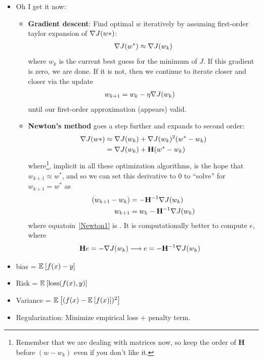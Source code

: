 \documentclass[12pt]{article}
\renewcommand{\matr}[1]{\mathbf{#1}}
\begin{document}
\begin{itemize}
	\item Oh I get it now:
	\begin{itemize}
		\item \textbf{Gradient descent}: Find optimal $w$ iteratively by assuming first-order taylor expansion of $\nabla J(w*)$:
		\begin{align}
			\nabla J(w^*) &\approx \nabla J(w_k) \\
		\end{align}
		where $w_k$ is the current best guess for the minimum of $J$. If this gradient is zero, we are done. If it is not, then we continue to iterate closer and closer via the update
		\begin{align}
			w_{k+1} &= w_k - \eta \nabla J(w_k)
		\end{align}
		until our first-order approximation (appears) valid. 
		\item \textbf{Newton's method} goes a step further and expands to second order:
		\begin{align}
			\gradJ{w*} &\approx \gradJ{w_k} + \gradJ{w_k}^2  (w^*-w_k) \\ 
			&= \gradJ{w_k} +  \matr{H}(w^*-w_k)
		\end{align}
		where\footnote{Remember that we are dealing with matrices now, so keep the order of $\matr{H}$ before $(w-w_k)$ even if you don't like it.}, implicit in all these optimization algorithms, is the hope that $w_{k + 1} \approx w^*$, and so we can set this derivative to 0 to ``solve'' for $w_{k+1} = w^*$ as
		\begin{align}
			(w_{k+1} - w_k) &= - \matr{H}^{-1} \gradJ{w_k} \\
			w_{k + 1} &= w_k - \matr{H}^{-1} \gradJ{w_k} \label{Newton1}
		\end{align}
		where equatoin~\ref{Newton1} is . It is computationally better to compute $e$, where
		\begin{align}
			\matr{H} e &= -\gradJ{w_k} \longrightarrow e = - \matr{H}^{-1} \gradJ{w_k}
		\end{align}
	\end{itemize}
\end{itemize}

\begin{itemize}
	\item bias = $\mathbb{E}_{}\left[f(x) - y\right]$
	\item Risk = $\mathbb{E}_{}\left[\text{loss}(f(x), y)\right]$
	\item Variance = $\mathbb{E}_{}\left[(f(x) - \mathbb{E}_{}\left[f(x)\right])^2\right]$
	\item Regularization: Minimize empirical loss + penalty term. 
\end{itemize}
\end{document}
